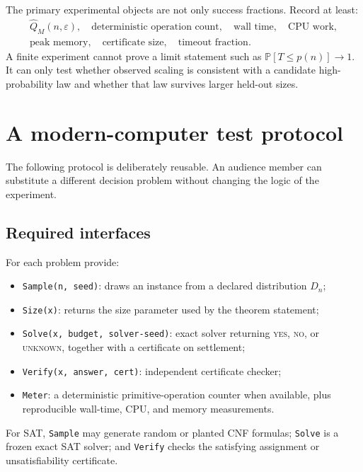 \documentclass[11pt]{article}
\theoremstyle{definition}
\newcommand{\Prob}{\mathbb{P}}
\begin{document}
The primary experimental objects are not only success fractions. Record at least:
\[
\begin{gathered}
\widehat Q_M(n,\varepsilon),\quad
\text{deterministic operation count},\quad
\text{wall time},\quad \text{CPU work},\\
\text{peak memory},\quad
\text{certificate size},\quad
\text{timeout fraction}.
\end{gathered}
\]
A finite experiment cannot prove a limit statement such as $\Prob[T\le p(n)]\to1$. It can only test whether observed scaling is consistent with a candidate high-probability law and whether that law survives larger held-out sizes.

\section{A modern-computer test protocol}
The following protocol is deliberately reusable. An audience member can substitute a different decision problem without changing the logic of the experiment.

\subsection*{Required interfaces}
For each problem provide:
\begin{itemize}
    \item \texttt{Sample(n, seed)}: draws an instance from a declared distribution $D_n$;
    \item \texttt{Size(x)}: returns the size parameter used by the theorem statement;
    \item \texttt{Solve(x, budget, solver-seed)}: exact solver returning \textsc{yes}, \textsc{no}, or \textsc{unknown}, together with a certificate on settlement;
    \item \texttt{Verify(x, answer, cert)}: independent certificate checker;
    \item \texttt{Meter}: a deterministic primitive-operation counter when available, plus reproducible wall-time, CPU, and memory measurements.
\end{itemize}

For SAT, \texttt{Sample} may generate random or planted CNF formulas; \texttt{Solve} is a frozen exact SAT solver; and \texttt{Verify} checks the satisfying assignment or unsatisfiability certificate.
\end{document}
